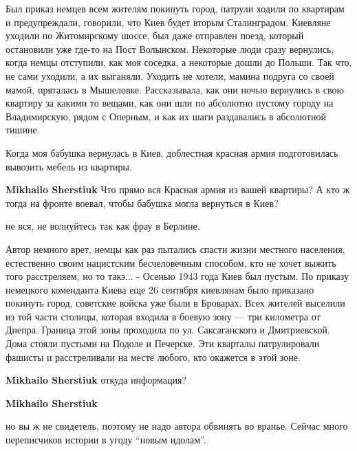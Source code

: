 \begin{itemize}

Был приказ немцев всем жителям покинуть город, патрули ходили по квартирам и
предупреждали, говорили, что Киев будет вторым Сталинградом. Киевляне уходили
по Житомирскому шоссе, был даже отправлен поезд, который остановили уже где-то
на Пост Волынском. Некоторые люди сразу вернулись, когда немцы отступили, как
моя соседка, а некоторые дошли до Польши. Так что, не сами уходили, а их
выганяли. Уходить не хотели, мамина подруга со своей мамой, пряталась в
Мышеловке. Рассказывала, как они ночью вернулись в свою квартиру за какими то
вещами, как они шли по абсолютно пустому городу на Владимирскую, рядом с
Оперным, и как их шаги раздавались в абсолютной тишине.


Когда моя бабушка вернулась в Киев, доблестная красная армия подготовилась
вывозить мебель из квартиры.

\begin{itemize} %
\textbf{Mikhailo Sherstiuk} Что прямо вся Красная армия из вашей квартиры? А кто ж тогда на фронте воевал, чтобы бабушка могла вернуться в Киев?

не вся, не волнуйтесь так как фрау в Берлине.
\end{itemize} %


Автор немного врет, немцы как раз пытались спасти жизни местного населения,
естественно своим нацистским бесчеловечным способом, кто не хочет выжить того
расстреляем, но то такэ... - Осенью 1943 года Киев был пустым. По приказу
немецкого коменданта Киева еще 26 сентября киевлянам было приказано покинуть
город, советские войска уже были в Броварах. Всех жителей выселили из той части
столицы, которая входила в боевую зону — три километра от Днепра. Граница этой
зоны проходила по ул. Саксаганского и Дмитриевской. Дома стояли пустыми на
Подоле и Печерске. Эти кварталы патрулировали фашисты и расстреливали на месте
любого, кто окажется в этой зоне.

\begin{itemize} %
\textbf{Mikhailo Sherstiuk} откуда информация?

\begin{itemize} %

\textbf{Mikhailo Sherstiuk} 

но вы ж не свидетель, поэтому не надо автора обвинять во вранье. Сейчас много
переписчиков истории в угоду \enquote{новым идолам}.



\end{itemize}
\end{itemize}
\end{itemize}
